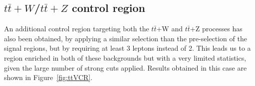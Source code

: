 \documentclass[a4paper, 10pt, openright]{report}
\begin{document}
\subsection{$t \bar t + W$/$t \bar t + Z$ control region} \label{section:ttVCR}

An additional control region targeting both the $t \bar t$+W and $t \bar t$+Z processes has also been obtained, by applying a similar selection than the pre-selection of the signal regions, but by requiring at least 3 leptons instead of 2. This leads us to a region enriched in both of these backgrounds but with a very limited statistics, given the large number of strong cuts applied. Results obtained in this case are shown in Figure~\ref{fig:ttVCR}.

\begin{figure}[htbp]
\centering
{}
\end{figure}
\end{document}
